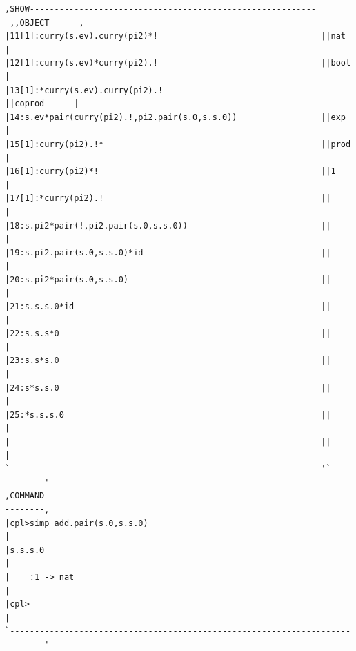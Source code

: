 \begin{verbatim}
,SHOW-----------------------------------------------------------,,OBJECT------,
|11[1]:curry(s.ev).curry(pi2)*!                                 ||nat         |
|12[1]:curry(s.ev)*curry(pi2).!                                 ||bool        |
|13[1]:*curry(s.ev).curry(pi2).!                                ||coprod      |
|14:s.ev*pair(curry(pi2).!,pi2.pair(s.0,s.s.0))                 ||exp         |
|15[1]:curry(pi2).!*                                            ||prod        |
|16[1]:curry(pi2)*!                                             ||1           |
|17[1]:*curry(pi2).!                                            ||            |
|18:s.pi2*pair(!,pi2.pair(s.0,s.s.0))                           ||            |
|19:s.pi2.pair(s.0,s.s.0)*id                                    ||            |
|20:s.pi2*pair(s.0,s.s.0)                                       ||            |
|21:s.s.s.0*id                                                  ||            |
|22:s.s.s*0                                                     ||            |
|23:s.s*s.0                                                     ||            |
|24:s*s.s.0                                                     ||            |
|25:*s.s.s.0                                                    ||            |
|                                                               ||            |
`---------------------------------------------------------------'`------------'
,COMMAND----------------------------------------------------------------------,
|cpl>simp add.pair(s.0,s.s.0)                                                 |
|s.s.s.0                                                                      |
|    :1 -> nat                                                                |
|cpl>                                                                         |
`-----------------------------------------------------------------------------'
\end{verbatim}

